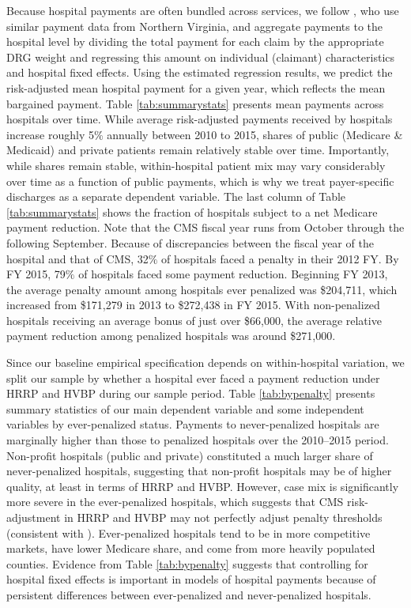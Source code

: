 \documentclass[12pt]{article}
\begin{document}
Because hospital payments are often bundled across services, we follow \citet{gowrisankaran2015}, who use similar payment data from Northern Virginia, and aggregate payments to the hospital level by dividing the total payment for each claim by the appropriate DRG weight and regressing this amount on individual (claimant) characteristics and hospital fixed effects.  Using the estimated regression results, we predict the risk-adjusted mean hospital payment for a given year, which reflects the mean bargained payment. Table \ref{tab:summarystats} presents mean payments across hospitals over time. While average risk-adjusted payments received by hospitals increase roughly 5$\%$ annually between 2010 to 2015, shares of public (Medicare \& Medicaid) and private patients remain relatively stable over time. Importantly, while shares remain stable, within-hospital patient mix may vary considerably over time as a function of public payments, which is why we treat payer-specific discharges as a separate dependent variable. The last column of Table \ref{tab:summarystats} shows the fraction of hospitals subject to a net Medicare payment reduction. Note that the CMS fiscal year runs from October through the following September. Because of discrepancies between the fiscal year of the hospital and that of CMS, 32$\%$ of hospitals faced a penalty in their 2012 FY. By FY 2015, 79$\%$ of hospitals faced some payment reduction. Beginning FY 2013, the average penalty amount among hospitals ever penalized was \$204,711, which increased from \$171,279 in 2013 to \$272,438 in FY 2015. With non-penalized hospitals receiving an average bonus of just over \$66,000, the average relative payment reduction among penalized hospitals was around \$271,000.

Since our baseline empirical specification depends on within-hospital variation, we split our sample by whether a hospital ever faced a payment reduction under HRRP and HVBP during our sample period.  Table \ref{tab:bypenalty} presents summary statistics of our main dependent variable and some independent variables by ever-penalized status.  Payments to never-penalized hospitals are marginally higher than those to penalized hospitals over the 2010--2015 period.  Non-profit hospitals (public and private) constituted a much larger share of never-penalized hospitals, suggesting that non-profit hospitals may be of higher quality, at least in terms of HRRP and HVBP.  However, case mix is significantly more severe in the ever-penalized hospitals, which suggests that CMS risk-adjustment in HRRP and HVBP may not perfectly adjust penalty thresholds (consistent with \cite{wilcock2018}).  Ever-penalized hospitals tend to be in more competitive markets, have lower Medicare share, and come from more heavily populated counties.  Evidence from Table \ref{tab:bypenalty} suggests that controlling for hospital fixed effects is important in models of hospital payments because of persistent differences between ever-penalized and never-penalized hospitals.
\end{document}
